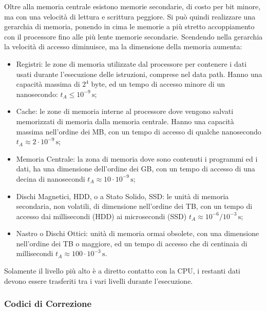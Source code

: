\documentclass{article}
\numberwithin{equation}{subsection}
\begin{document}
Oltre alla memoria centrale esistono memorie secondarie, di costo per bit minore, ma con una velocità di lettura e scrittura peggiore. Si può quindi realizzare una gerarchia di memoria, 
ponendo in cima le memorie a più stretto accoppiamento con il processore fino alle più lente memorie secondarie. Scendendo nella gerarchia la velocità di accesso diminuisce, ma la dimensione della memoria 
aumenta:
\begin{itemize}
    \item Registri: le zone di memoria utilizzate dal processore per contenere i dati usati durante l'esecuzione delle istruzioni, comprese nel data path. Hanno una capacità massima di $2^4$ byte, ed un tempo di accesso minore di un nanosecondo: $t_A\leq10^{-9}\,\mathrm{s}$;
    \item Cache: le zone di memoria interne al processore dove vengono salvati memorizzati di memoria dalla memoria centrale. Hanno una capacità massima nell'ordine dei MB, con un tempo di accesso di qualche nanosecondo $t_A\approx2\cdot10^{-9}\,\mathrm{s}$;
    \item Memoria Centrale: la zona di memoria dove sono contenuti i programmi ed i dati, ha una dimensione dell'ordine dei GB, con un tempo di accesso di una decina di nanosecondi $t_A\approx10\cdot10^{-9}\,\mathrm{s}$; 
    \item Dischi Magnetici, HDD, o a Stato Solido, SSD: le unità di memoria secondaria, non volatili, di dimensione nell'ordine dei TB, con un tempo di accesso dai millisecondi (HDD) ai microsecondi (SSD) $t_A\approx10^{-6}/10^{-3}\,\mathrm{s}$;
    \item Nastro o Dischi Ottici: unità di memoria ormai obsolete, con una dimensione nell'ordine dei TB o maggiore, ed un tempo di accesso che di centinaia di millisecondi $t_A\approx100\cdot10^{-3}\,\mathrm{s}$.  
\end{itemize}

Solamente il livello più alto è a diretto contatto con la CPU, i restanti dati devono essere trasferiti tra i vari livelli durante l'esecuzione. 

\subsubsection{Codici di Correzione}
\end{document}
